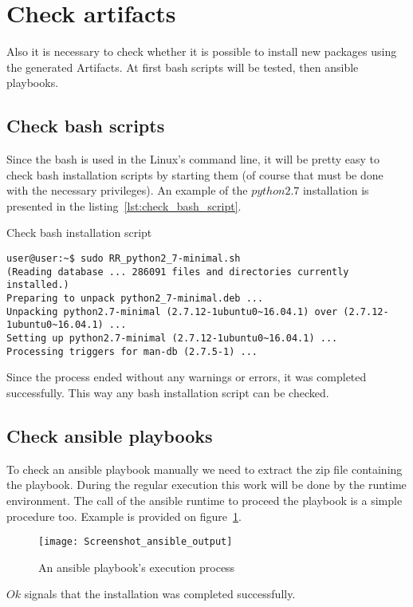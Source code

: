 \section{Check artifacts}\label{sec:checkart}
Also it is necessary to check whether it is possible to install new packages using the generated Artifacts.
At first bash scripts will be tested, then ansible playbooks.
\subsection{Check bash scripts}
Since the bash is used in the Linux's command line, it will be pretty easy to check bash installation scripts by starting them (of course that must be done with the necessary privileges).
An example of the $python2.7$ installation is presented in the listing~\ref{lst:check_bash_script}.\\
\begin{Listing}
\caption{Check bash installation script}
\label{lst:check_bash_script}
\begin{lstlisting}
user@user:~$ sudo RR_python2_7-minimal.sh 
(Reading database ... 286091 files and directories currently installed.)
Preparing to unpack python2_7-minimal.deb ...
Unpacking python2.7-minimal (2.7.12-1ubuntu0~16.04.1) over (2.7.12-1ubuntu0~16.04.1) ...
Setting up python2.7-minimal (2.7.12-1ubuntu0~16.04.1) ...
Processing triggers for man-db (2.7.5-1) ...
\end{lstlisting}
\end{Listing}
Since the process ended without any warnings or errors, it was completed successfully.
This way any bash installation script can be checked.

\subsection{Check ansible playbooks}
To check an ansible playbook manually we need to extract the zip file containing the playbook. 
During the regular execution this work will be done by the runtime environment.
The call of the ansible runtime to proceed the playbook is a simple procedure too.
Example is provided on figure~\ref{fig:ansible_output2}.\\
 \begin{figure}[ht]   
	\centering
	\texttt{[image: Screenshot\_ansible\_output]}
	\caption{An ansible playbook's execution process}
	\label{fig:ansible_output2}
\end{figure}
$Ok$ signals that the installation was completed successfully.